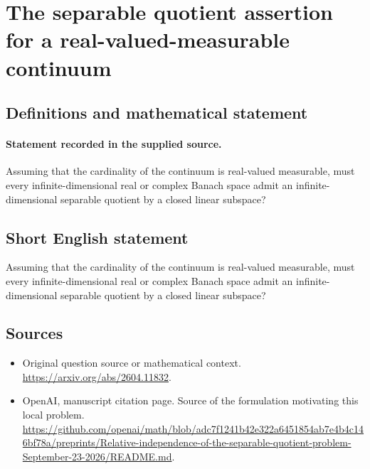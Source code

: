 \documentclass[11pt]{article}
\begin{document}
\section*{The separable quotient assertion for a real-valued-measurable continuum}\label{statement}
\subsection{Definitions and mathematical statement}
\paragraph{Statement recorded in the supplied source.}
Assuming that the cardinality of the continuum is real-valued measurable, must every infinite-dimensional real or complex Banach space admit an infinite-dimensional separable quotient by a closed linear subspace?
\subsection{Short English statement}
Assuming that the cardinality of the continuum is real-valued measurable, must every infinite-dimensional real or complex Banach space admit an infinite-dimensional separable quotient by a closed linear subspace?
\subsection{Sources}
\begin{itemize}
\item[S1] Original question source or mathematical context.
\url{https://arxiv.org/abs/2604.11832}.
\item[S2] OpenAI, manuscript citation page. Source of the formulation motivating this local problem.
\url{https://github.com/openai/math/blob/adc7f1241b42e322a6451854ab7e4b4c146bf78a/preprints/Relative-independence-of-the-separable-quotient-problem-September-23-2026/README.md}.
\end{itemize}
\end{document}
